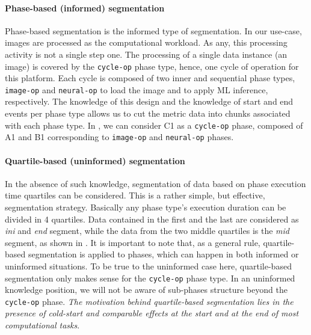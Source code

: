\paragraph*{Phase-based (informed) segmentation}
Phase-based segmentation is the informed type of segmentation. In our use-case, images are processed as the computational workload. As any, this processing activity is not a single step one. The processing of a single data instance (an image) is covered by the \texttt{cycle-op} phase type, hence, one cycle of operation for this platform. Each cycle is composed of two inner and sequential phase types, \texttt{image-op} and \texttt{neural-op} to load the image and to apply ML inference, respectively. The knowledge of this design and the knowledge of start and end events per phase type allows us to cut the metric data into chunks associated with each phase type. In , we can consider C1 as a \texttt{cycle-op} phase, composed of A1 and B1 corresponding to \texttt{image-op} and \texttt{neural-op} phases.

\paragraph*{Quartile-based (uninformed) segmentation}
In the absence of such knowledge, segmentation of data based on phase execution time quartiles can be considered. This is a rather simple, but effective, segmentation strategy. Basically any phase type's execution duration can be divided in 4 quartiles. Data contained in the first and the last are considered as \emph{ini} and \emph{end} segment, while the data from the two middle quartiles is the \emph{mid} segment, as shown in . It is important to note that, as a general rule, quartile-based segmentation is applied to phases, which can happen in both informed or uninformed situations. To be true to the uninformed case here, quartile-based segmentation only makes sense for the \texttt{cycle-op} phase type. In an uninformed knowledge position, we will not be aware of sub-phases structure beyond the \texttt{cycle-op} phase. \emph{The motivation behind quartile-based segmentation lies in the presence of cold-start and comparable effects at the start and at the end of most computational tasks}.

